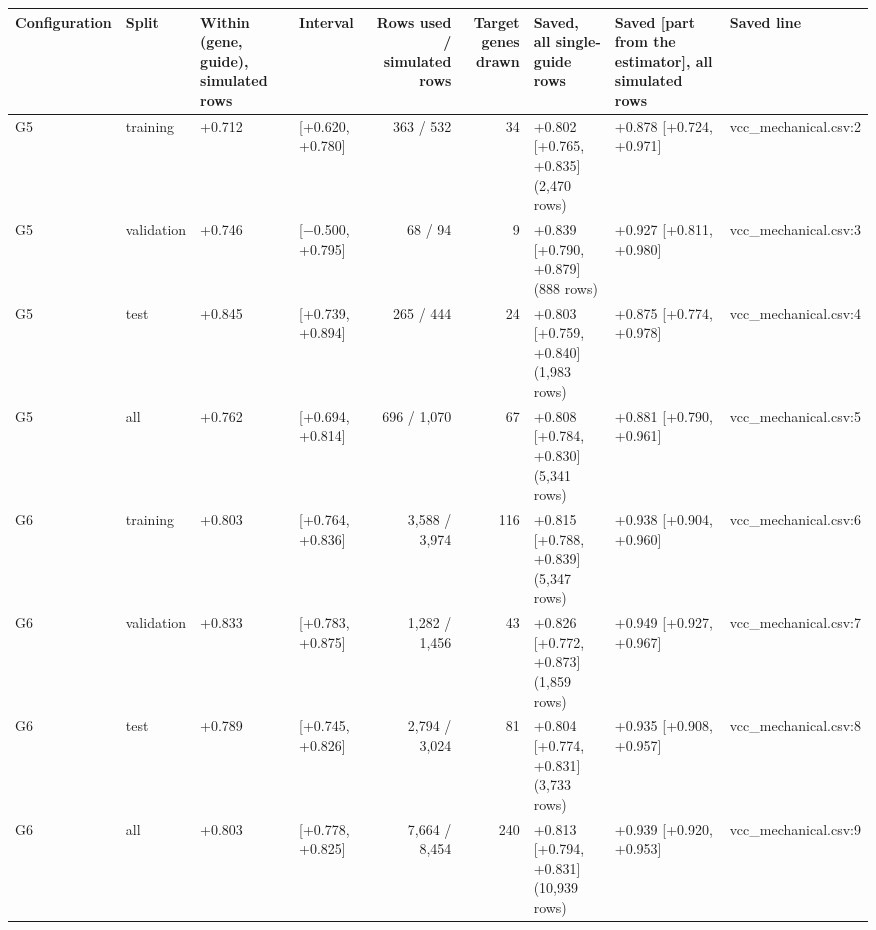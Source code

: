 \begin{tabular}{llllrrlll}
\toprule
Configuration & Split & Within (gene, guide), simulated rows & Interval & Rows used / simulated rows & Target genes drawn & Saved, all single-guide rows & Saved [part from the estimator], all simulated rows & Saved line \\
\midrule
G5 & training & +0.712 & [+0.620, +0.780] & 363 / 532 & 34 & +0.802 [+0.765, +0.835] (2,470 rows) & +0.878 [+0.724, +0.971] & vcc\_mechanical.csv:2 \\
G5 & validation & +0.746 & [−0.500, +0.795] & 68 / 94 & 9 & +0.839 [+0.790, +0.879] (888 rows) & +0.927 [+0.811, +0.980] & vcc\_mechanical.csv:3 \\
G5 & test & +0.845 & [+0.739, +0.894] & 265 / 444 & 24 & +0.803 [+0.759, +0.840] (1,983 rows) & +0.875 [+0.774, +0.978] & vcc\_mechanical.csv:4 \\
G5 & all & +0.762 & [+0.694, +0.814] & 696 / 1,070 & 67 & +0.808 [+0.784, +0.830] (5,341 rows) & +0.881 [+0.790, +0.961] & vcc\_mechanical.csv:5 \\
G6 & training & +0.803 & [+0.764, +0.836] & 3,588 / 3,974 & 116 & +0.815 [+0.788, +0.839] (5,347 rows) & +0.938 [+0.904, +0.960] & vcc\_mechanical.csv:6 \\
G6 & validation & +0.833 & [+0.783, +0.875] & 1,282 / 1,456 & 43 & +0.826 [+0.772, +0.873] (1,859 rows) & +0.949 [+0.927, +0.967] & vcc\_mechanical.csv:7 \\
G6 & test & +0.789 & [+0.745, +0.826] & 2,794 / 3,024 & 81 & +0.804 [+0.774, +0.831] (3,733 rows) & +0.935 [+0.908, +0.957] & vcc\_mechanical.csv:8 \\
G6 & all & +0.803 & [+0.778, +0.825] & 7,664 / 8,454 & 240 & +0.813 [+0.794, +0.831] (10,939 rows) & +0.939 [+0.920, +0.953] & vcc\_mechanical.csv:9 \\
\bottomrule
\end{tabular}
